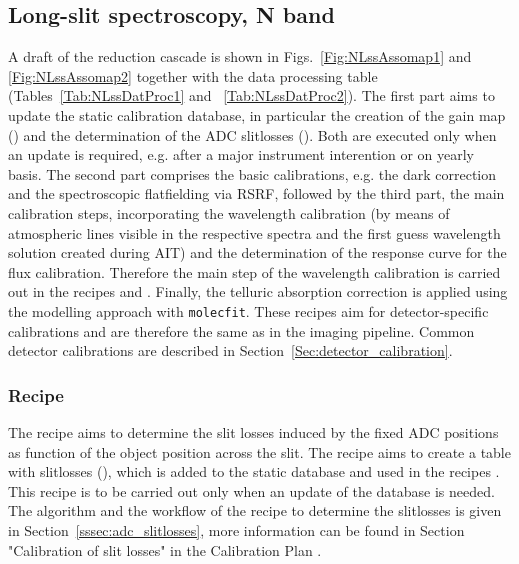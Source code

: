 \clearpage
\subsection{Long-slit spectroscopy, N band}
\label{ssec:recipes_lss_n}
A draft of the reduction cascade is shown in
Figs.~\ref{Fig:NLssAssomap1} and \ref{Fig:NLssAssomap2} together with the data processing table
(Tables~\ref{Tab:NLssDatProc1} and ~\ref{Tab:NLssDatProc2}). The first part aims to update the static calibration database, in particular the creation of the gain map (\hyperref[Sec:detector_calibration]{}) and the determination of the \ac{ADC} slitlosses (\hyperref[rec:metis_n_adc_slitloss]{}). Both are executed only when an update is required, e.g. after a major instrument interention or on yearly basis. The second part comprises the basic calibrations, e.g. the dark correction and the spectroscopic flatfielding via \ac{RSRF}, followed by the third part, the main calibration steps, incorporating the wavelength calibration (by means of atmospheric lines visible in the respective spectra and the first guess wavelength solution created during \ac{AIT}) and the determination of the response curve for the flux calibration. Therefore the main step of the wavelength calibration is carried out in the recipes \hyperref[rec:metis_n_lss_std]{} and \hyperref[rec:metis_lm_lss_sci]{}. Finally, the telluric absorption correction is applied using the modelling approach with \texttt{molecfit}.
These recipes aim for detector-specific calibrations and are therefore the same as in the imaging pipeline. Common detector calibrations are described in Section~\ref{Sec:detector_calibration}.
\subsubsection{Recipe }
The recipe \hyperref[sssec:adc_slitlosses]{} aims to determine the slit losses induced by the fixed \ac{ADC} positions as function of the object position across the slit. The recipe aims to create a table with slitlosses (\hyperref[dataitem:n_adc_slitloss]{}), which is added to the static database and used in the recipes \hyperref[rec:metis_n_lss_std]{}. This recipe is to be carried out only when an update of the database is needed. The algorithm and the workflow of the recipe to determine the slitlosses is given in Section~\ref{sssec:adc_slitlosses}, more information can be found in Section "Calibration of slit losses" in the Calibration Plan \cite{METIS-calibration_plan}. 

